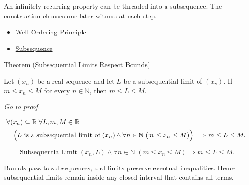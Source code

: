 \begin{remark*}[Interpretation]
An infinitely recurring property can be threaded into a subsequence. The
construction chooses one later witness at each step.
\end{remark*}

\begin{dependencies}
\begin{itemize}
  \item \hyperref[thm:well-ordering-principle]{Well-Ordering Principle}
  \item \hyperref[def:subsequence]{Subsequence}
\end{itemize}
\end{dependencies}


\begin{theorembox}{Theorem (Subsequential Limits Respect Bounds)}
\begin{theorem}
\label{thm:subsequential-limits-respect-bounds}
Let $(x_n)$ be a real sequence and let $L$ be a subsequential limit of
$(x_n)$. If $m\le x_n\le M$ for every $n\in\mathbb{N}$, then
$m\le L\le M$.

\smallskip
\noindent
\hyperref[prf:subsequential-limits-respect-bounds]{\textit{Go to proof.}}
\end{theorem}
\end{theorembox}

\begin{remark*}
\[
\begin{aligned}
&\forall (x_n)\subseteq\mathbb{R}\;\forall L,m,M\in\mathbb{R}\\
&\quad\Bigl(
  L\text{ is a subsequential limit of }(x_n)
  \land
  \forall n\in\mathbb{N}\;(m\le x_n\le M)
\Bigr)
\Longrightarrow
m\le L\le M.
\end{aligned}
\]
\end{remark*}

\begin{remark*}
\[
\operatorname{SubsequentialLimit}(x_n,L)
\land
\forall n\in\mathbb{N}\;(m\le x_n\le M)
\Longrightarrow
m\le L\le M.
\]
\end{remark*}

\begin{remark*}[Interpretation]
Bounds pass to subsequences, and limits preserve eventual inequalities. Hence
subsequential limits remain inside any closed interval that contains all terms.
\end{remark*}


